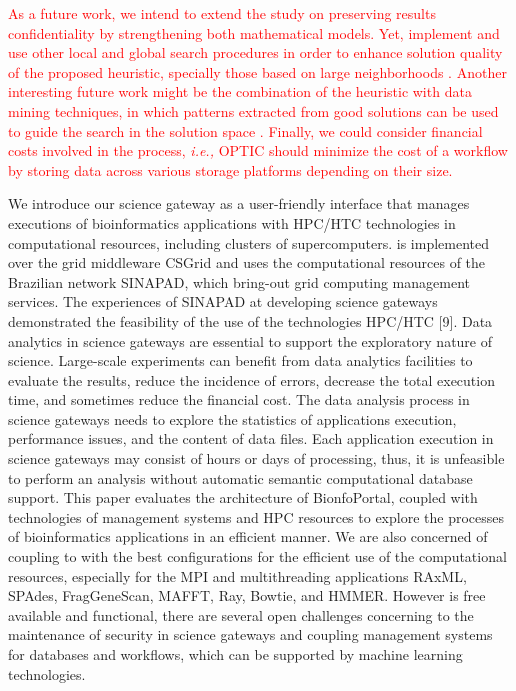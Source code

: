 \textcolor{red}{As a future work, we intend to extend the study on preserving results confidentiality by strengthening both mathematical models. Yet, implement and use other local and global search procedures in order to enhance solution quality of the proposed heuristic, specially those based on large neighborhoods \cite{Capua2018}. Another interesting future work might be the combination of the heuristic with data mining techniques, in which patterns extracted from good solutions can be used to guide the search in the solution space \cite{deLimaMartins2018}. Finally, we could consider financial costs involved in the process, \textit{i.e.,} OPTIC should minimize the  cost  of  a  workflow by  storing  data  across various  storage  platforms  depending  on  their  size.}







We introduce our science gateway \system as a user-friendly interface that manages executions of bioinformatics applications with HPC/HTC technologies in computational resources, including clusters of supercomputers. \system is implemented over the grid middleware CSGrid and uses the computational resources of the Brazilian network SINAPAD, which bring-out grid computing management services. The experiences of SINAPAD at developing science gateways demonstrated the feasibility of the use of the technologies HPC/HTC [9].
Data analytics in science gateways are essential to support the exploratory nature of science. Large-scale experiments can benefit from data analytics facilities to evaluate the results, reduce the incidence of errors, decrease the total execution time, and sometimes reduce the financial cost. The data analysis process in science gateways needs to explore the statistics of applications execution, performance issues, and the content of data files. Each application execution in science gateways may consist of hours or days of processing, thus, it is unfeasible to perform an analysis without automatic semantic computational database support.
This paper evaluates the architecture of BionfoPortal, coupled with technologies of management systems and HPC resources to explore the processes of bioinformatics applications in an efficient manner. We are also concerned of coupling to \system with the best configurations for the efficient use of the computational resources, especially for the MPI and multithreading applications RAxML, SPAdes, FragGeneScan, MAFFT, Ray, Bowtie, and HMMER. However \system is free available and functional, there are several open challenges concerning to the maintenance of security in science gateways and coupling management systems for databases and workflows, which can be supported by machine learning technologies.
